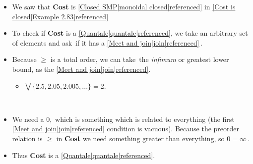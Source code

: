 
\begin{itemize}
    \item  We saw that \textbf{Cost} is \ref{Closed SMP|monoidal closed|referenced} in \ref{Cost is closed|Example 2.83|referenced}
    \item To check if \textbf{Cost} is a \ref{Quantale|quantale|referenced}, we take an arbitrary set of elements and ask \,if it has a \ref{Meet and join|join|referenced}\,.
    \item Because $\geq$ is a total order, we can take \,the \emph{infimum} or greatest lower bound, as the \ref{Meet and join|join|referenced}.
          \begin{itemize}
            \item $\bigvee\{2.5,2.05,2.005,...\} = 2$.
          \end{itemize}\,
    \item We need a $0$, \,which is something which is related to everything (the first \ref{Meet and join|join|referenced} condition is vacuous). Because the preorder relation is $\geq$ in \textbf{Cost} we need something greater than everything, so $0 = \infty$\,.
    \item Thus \textbf{Cost} is a \ref{Quantale|quantale|referenced}.
  \end{itemize}